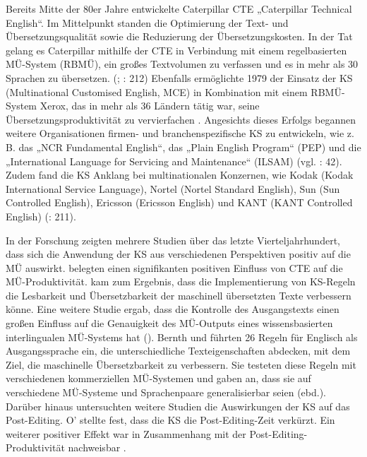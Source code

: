 Bereits Mitte der 80er Jahre entwickelte Caterpillar CTE „Caterpillar Technical English“. Im Mittelpunkt standen die Optimierung der Text- und Übersetzungsqualität sowie die Reduzierung der Übersetzungskosten. In der Tat gelang es Caterpillar mithilfe der CTE in Verbindung mit einem regelbasierten MÜ-System (RBMÜ), ein großes Textvolumen zu verfassen und es in mehr als 30 Sprachen zu übersetzen. (\citealt{KamprathEtAl1998}; \citealt{DrewerZiegler2014}: 212) Ebenfalls ermöglichte 1979 der Einsatz der KS (Multinational Customised English, MCE) in Kombination mit einem RBMÜ-System Xerox, das in mehr als 36 Ländern tätig war, seine Übersetzungsproduktivität zu vervierfachen \citep{Elliston1979}. Angesichts dieses Erfolgs begannen weitere Organisationen firmen- und branchenspezifische KS zu entwickeln, wie z. B. das „NCR Fundamental English“, das „Plain English Program“ (PEP) und die „International Language for Servicing and Maintenance“ (ILSAM) (vgl. \citealt{Schwanke1991}: 42). Zudem fand die KS Anklang bei multinationalen Konzernen, wie Kodak (Kodak International Service Language), Nortel (Nortel Standard English), Sun (Sun Controlled English), Ericsson (Ericsson English) und KANT (KANT Controlled English) (\citealt{DrewerZiegler2014}: 211).

In der Forschung zeigten mehrere Studien über das letzte Vierteljahrhundert, dass sich die Anwendung der KS aus verschiedenen Perspektiven positiv auf die MÜ auswirkt. \citet{KamprathEtAl1998} belegten einen signifikanten positiven Einfluss von CTE auf die MÜ-Produktivität. \citet{Reuther2003} kam zum Ergebnis, dass die Implementierung von KS-Regeln die Lesbarkeit und Übersetzbarkeit der maschinell übersetzten Texte verbessern könne. Eine weitere Studie ergab, dass die Kontrolle des Ausgangstexts einen großen Einfluss auf die Genauigkeit des MÜ-Outputs eines wissensbasierten interlingualen MÜ-Systems hat (\citealt{NybergMitamura1996}). Bernth und \citet{Gdaniec2001} führten 26 Regeln für Englisch als Ausgangssprache ein, die unterschiedliche Texteigenschaften abdecken, mit dem Ziel, die maschinelle Übersetzbarkeit zu verbessern. Sie testeten diese Regeln mit verschiedenen kommerziellen MÜ-Systemen und gaben an, dass sie auf verschiedene MÜ-Systeme und Sprachenpaare generalisierbar seien (ebd.). Darüber hinaus untersuchten weitere Studien die Auswirkungen der KS auf das Post-Editing. O’\citet{Brien2006} stellte fest, dass die KS die Post-Editing-Zeit verkürzt. Ein weiterer positiver Effekt war in Zusammenhang mit der Post-Editing-Produktivität nachweisbar \citep{AikawaEtAl2007}.

